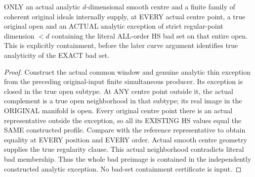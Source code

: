 \begin{lemma}
\label{hir:original-full-hs-variation-actual-local-thin-envelope}
\leanok
ONLY an actual analytic $d$-dimensional smooth centre and a finite family
of coherent original ideals internally supply, at EVERY actual centre
point, a true original open and an ACTUAL analytic exception of strict
regular-point dimension $<d$ containing the literal ALL-order HS bad set
on that entire open. This is explicitly containment, before the later
curve argument identifies true analyticity of the EXACT bad set.
\end{lemma}
\begin{proof}
Construct the actual common window and genuine analytic thin exception
from the preceding original-input finite simultaneous producer. Its
exception is closed in the true open subtype. At ANY centre point outside
it, the actual complement is a true open neighborhood in that subtype;
its real image in the ORIGINAL manifold is open. Every original centre
point there is an actual representative outside the exception, so all
its EXISTING HS values equal the SAME constructed profile. Compare with
the reference representative to obtain equality at EVERY position and
EVERY order. Actual smooth centre geometry supplies the true regularity
clause. This actual neighborhood contradicts literal bad membership.
Thus the whole bad preimage is contained in the independently constructed
analytic exception. No bad-set containment certificate is input.
\end{proof}

